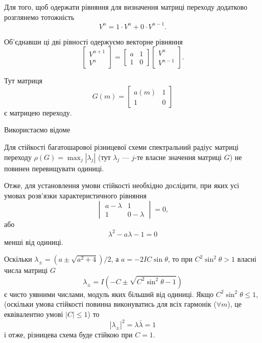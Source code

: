 Для того, щоб одержати рівняння для визначення матриці переходу додатково розглянемо тотожність
\begin{equation*}
    V^n = 1 \cdot V^n + 0 \cdot V^{n - 1}.    
\end{equation*}

Об'єднавши ці дві рівності одержуємо векторне рівняння
\begin{equation*}
    \begin{bmatrix}
        V^{n + 1} \\ V^n
    \end{bmatrix} = 
    \begin{bmatrix}
        a & 1 \\ 1 & 0
    \end{bmatrix}
    \begin{bmatrix}
        V^n \\ V^{n - 1}
    \end{bmatrix}.
\end{equation*}

Тут матриця 
\begin{equation*}
    G(m) = 
    \begin{bmatrix}
        a(m) & 1 \\ 1 & 0
    \end{bmatrix}
\end{equation*}
є матрицею переходу. \medskip

Використаємо відоме
\begin{proposition}
    Для стійкості багатошарової різницевої схеми спектральний радіус матриці переходу $\rho(G) = \max_j |\lambda_j|$ (тут $\lambda_j$ --- $j$-те власне значення матриці $G$) не повинен перевищувати одиниці. 
\end{proposition}

Отже, для установлення умови стійкості необхідно дослідити, при яких усі умовах розв'язки характеристичного рівняння 
\begin{equation*}
    \begin{vmatrix}
        a - \lambda & 1 \\ 1 & 0 - \lambda
    \end{vmatrix} = 0,
\end{equation*}
або
\begin{equation*}
    \lambda^2 - a \lambda - 1 = 0
\end{equation*}
менші від одиниці. \medskip

Оскільки $\lambda_\pm = (a \pm \sqrt{a^2 + 4}) / 2$, а $a = -2IC \sin\theta$, то при $C^2 \sin^2 \theta > 1$ власні числа матриці  $G$
\begin{equation*}
    \lambda_\pm = I (-C \pm \sqrt{C^2 \sin^2 \theta - 1})
\end{equation*}
є чисто уявними числами, модуль яких більший від одиниці. Якщо $C^2 \sin^2 \theta \le 1$, (оскільки умова стійкості повинна виконуватись для всіх гармонік ($\forall m$), це еквівалентно умові $|C| \le 1$) то 
\begin{equation*}
    |\lambda_\pm|^2 = \lambda \bar \lambda = 1
\end{equation*}
і отже, різницева схема буде стійкою при $C = 1$. \medskip

